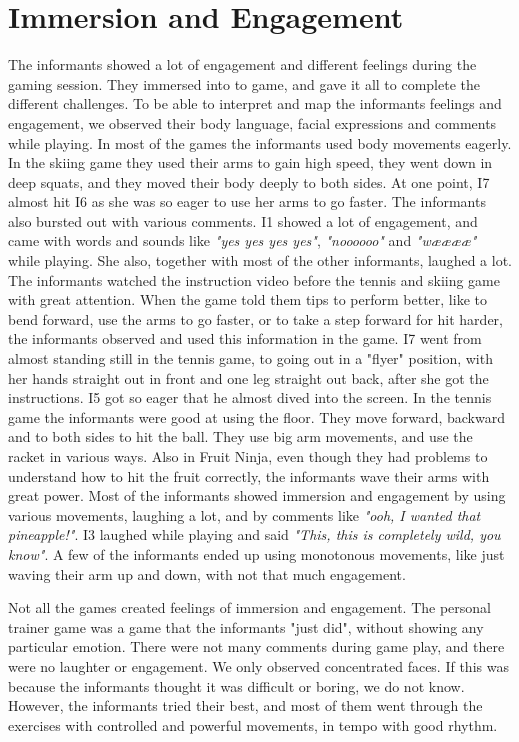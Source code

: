 \section{Immersion and Engagement}
The informants showed a lot of engagement and different feelings during the gaming session. They immersed into to game, and gave it all to complete the different challenges. To be able to interpret and map the informants feelings and engagement, we observed their body language, facial expressions and comments while playing. In most of the games the informants used body movements eagerly. In the skiing game they used their arms to gain high speed, they went down in deep squats, and they moved their body deeply to both sides. At one point, I7 almost hit I6 as she was so eager to use her arms to go faster. The informants also bursted out with various comments. I1 showed a lot of engagement, and came with words and sounds like \emph{"yes yes yes yes"}, \emph{"noooooo"} and \emph{"wææææ"} while playing. She also, together with most of the other informants, laughed a lot. The informants watched the instruction video before the tennis and skiing game with great attention. When the game told them tips to perform better, like to bend forward, use the arms to go faster, or to take a step forward for hit harder, the informants observed and used this information in the game. I7 went from almost standing still in the tennis game, to going out in a "flyer" position, with her hands straight out in front and one leg straight out back, after she got the instructions. I5 got so eager that he almost dived into the screen. In the tennis game the informants were good at using the floor. They move forward, backward and to both sides to hit the ball. They use big arm movements, and use the racket in various ways. Also in Fruit Ninja, even though they had problems to understand how to hit the fruit correctly, the informants wave their arms with great power. Most of the informants showed immersion and engagement by using various movements, laughing a lot, and by comments like \emph{"ooh, I wanted that pineapple!"}. I3 laughed while playing and said \emph{"This, this is completely wild, you know"}. A few of the informants ended up using monotonous movements, like just waving their arm up and down, with not that much engagement. 

Not all the games created feelings of immersion and engagement. The personal trainer game was a game that the informants "just did", without showing any particular emotion. There were not many comments during game play, and there were no laughter or engagement. We only observed concentrated faces. If this was because the informants thought it was difficult or boring, we do not know. However, the informants tried their best, and most of them went through the exercises with controlled and powerful movements, in tempo with good rhythm.       

